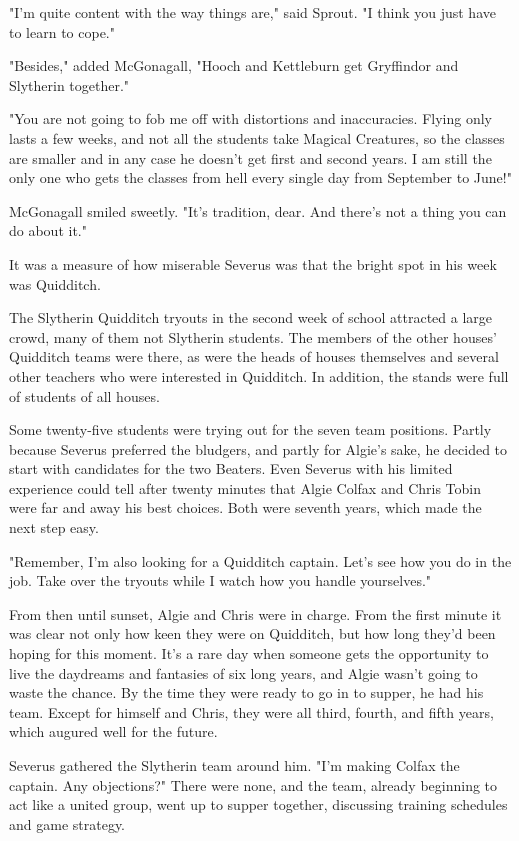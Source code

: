 \documentclass[a4paper,11pt]{article}
\begin{document}
"I'm quite content with the way things are," said Sprout. "I think you just have to learn to cope."

"Besides," added McGonagall, "Hooch and Kettleburn get Gryffindor and Slytherin together."

"You are not going to fob me off with distortions and inaccuracies. Flying only lasts a few weeks, and not all the students take Magical Creatures, so the classes are smaller and in any case he doesn't get first and second years. I am still the only one who gets the classes from hell every single day from September to June!"

McGonagall smiled sweetly. "It's tradition, dear. And there's not a thing you can do about it."

It was a measure of how miserable Severus was that the bright spot in his week was Quidditch.

The Slytherin Quidditch tryouts in the second week of school attracted a large crowd, many of them not Slytherin students. The members of the other houses' Quidditch teams were there, as were the heads of houses themselves and several other teachers who were interested in Quidditch. In addition, the stands were full of students of all houses.

Some twenty-five students were trying out for the seven team positions. Partly because Severus preferred the bludgers, and partly for Algie's sake, he decided to start with candidates for the two Beaters. Even Severus with his limited experience could tell after twenty minutes that Algie Colfax and Chris Tobin were far and away his best choices. Both were seventh years, which made the next step easy.

"Remember, I'm also looking for a Quidditch captain. Let's see how you do in the job. Take over the tryouts while I watch how you handle yourselves."

From then until sunset, Algie and Chris were in charge. From the first minute it was clear not only how keen they were on Quidditch, but how long they'd been hoping for this moment. It's a rare day when someone gets the opportunity to live the daydreams and fantasies of six long years, and Algie wasn't going to waste the chance. By the time they were ready to go in to supper, he had his team. Except for himself and Chris, they were all third, fourth, and fifth years, which augured well for the future.

Severus gathered the Slytherin team around him. "I'm making Colfax the captain. Any objections?" There were none, and the team, already beginning to act like a united group, went up to supper together, discussing training schedules and game strategy.
\end{document}
